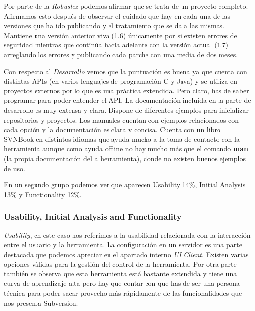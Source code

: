 \documentclass[11pt]{scrartcl}
\begin{document}
\par Por parte de la \emph{Robustez} podemos afirmar que se trata de un proyecto completo. Afirmamos esto despu\'es de observar el cuidado que hay en cada una de las versiones que ha ido publicando y el tratamiento que se da a las mismas. Mantiene una versi\'on anterior viva (1.6) \'unicamente por si existen errores de seguridad mientras que contin\'ua hacia adelante con la versi\'on actual (1.7) arreglando los errores y publicando cada parche con una media de dos meses.

\par Con respecto al \emph{Desarrollo} vemos que la puntuaci\'on es buena ya que cuenta con distintas APIs (en varios lenguajes de programaci\'on C y Java) y se utiliza en proyectos externos por lo que es una pr\'actica extendida. Pero claro, has de saber programar para poder entender el API.
La documentaci\'on incluida en la parte de desarrollo es muy extensa y clara. Dispone de diferentes ejemplos para inicializar repositorios y proyectos. Los manuales cuentan con ejemplos relacionados con cada opci\'on y la documentaci\'on es clara y concisa. Cuenta con un libro SVNBook en distintos idiomas que ayuda mucho a la toma de contacto con la herramienta aunque como ayuda offline no hay mucho m\'as que el comando \textbf{man} (la propia documentaci\'on del a herramienta), donde no existen buenos ejemplos de uso.

\par En un segundo grupo podemos ver que aparecen Usability 14\%, Initial Analysis 13\% y Functionality 12\%.

\subsubsection{Usability, Initial Analysis and Functionality}

\par \emph{Usability}, en este caso nos referimos a la usabilidad relacionada con la interacci\'on entre el usuario y la herramienta. La configuraci\'on en un servidor es una parte destacada que podemos apreciar en el apartado interno \emph{UI Client}. Existen varias opciones v\'alidas para la gesti\'on del control de la herramienta. Por otra parte tambi\'en se observa que esta herramienta est\'a bastante extendida y tiene una curva de aprendizaje alta pero hay que contar con que has de ser una persona t\'ecnica para poder sacar provecho m\'as r\'apidamente de las funcionalidades que nos presenta Subversion.
\end{document}

